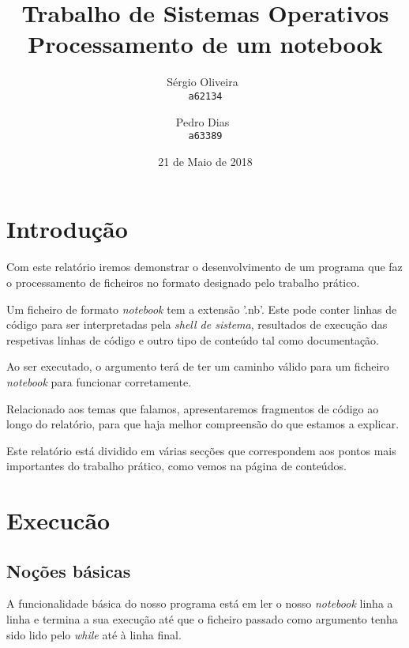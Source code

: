 \documentclass[11pt,a4paper]{report}
\begin{document}
\title{Trabalho de Sistemas Operativos\\Processamento de um notebook}
\author{
   Sérgio Oliveira~\\
   \texttt{a62134}
   \and
   Pedro Dias~\\
   \texttt{a63389}
}
\date{21 de Maio de 2018}
\maketitle
\raggedbottom
\pagebreak
\pagebreak


\tableofcontents
\pagebreak
\chapter{Introdução}
Com este relatório iremos demonstrar o desenvolvimento de um programa que faz o processamento de ficheiros no formato designado pelo trabalho prático.

Um ficheiro de formato \textit{notebook} tem a extensão '.nb'. Este pode conter linhas de código para ser interpretadas pela \textit{shell de sistema}, resultados de execução das respetivas linhas de código e outro tipo de conteúdo tal como documentação.

Ao ser executado, o argumento terá de ter um caminho válido para um ficheiro \textit{notebook} para funcionar corretamente.

Relacionado aos temas que falamos, apresentaremos fragmentos de código ao longo do relatório, para que haja melhor compreensão do que estamos a explicar.

Este relatório está dividido em várias secções que correspondem aos pontos mais importantes do trabalho prático, como vemos na página de conteúdos.

\raggedbottom
\pagebreak


\chapter{Execucão}
\section{Noções básicas}

A funcionalidade básica do nosso programa está em ler o nosso \textit{notebook} linha a linha e termina a sua execução até que o ficheiro passado como argumento tenha sido lido pelo \textit{while} até à linha final.
\end{document}
